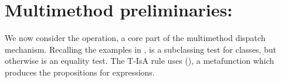 %
%

\section{Multimethod preliminaries: \isaliteral}

\label{sec:isaformal}

We now consider the \isaliteral{} operation, a core part of the multimethod dispatch mechanism. 
Recalling the examples in ,
\isaliteral{} is
a subclassing test for classes, but otherwise is an equality test.
%
The T-IsA rule uses \isacompareliteral{}
(), a metafunction which produces the propositions for
\isaliteral{} expressions.

